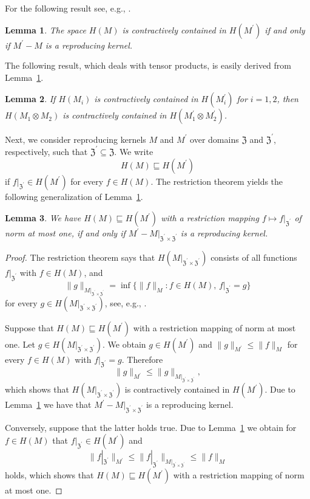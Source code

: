 \documentclass{article}
\newcommand{\Z}{{\mathfrak Z}}
\theoremstyle{plain}
\newtheorem{lemma}{Lemma}
\theoremstyle{definition}
\begin{document}
For the following result see, e.g., \citet[Cor.~5.3]{PR16}.

\begin{lemma}\label{l10}
The space $H(M)$ is contractively contained in $H(M^\prime)$ if and only 
if $M^\prime-M$ is a reproducing kernel.
\end{lemma}

The following result, which deals with tensor products, is easily
derived from Lemma~\ref{l10}.

\begin{lemma}\label{l11}
If $H(M_i)$ is contractively contained in $H(M^\prime_i)$
for $i=1,2$, then $H(M_1 \otimes M_2)$ is contractively contained
in $H(M^\prime_1 \otimes M^\prime_2)$.
\end{lemma}

Next, we consider reproducing kernels $M$ and $M^\prime$ over 
domains $\Z$ and $\Z^\prime$,
respectively, such that $\Z^\prime \subseteq \Z$.
We write 
\[
H(M) \sqsubseteq H(M^\prime)
\] 
if $f|_{\Z^\prime} \in H(M^\prime)$ for 
every $f\in H(M)$. The restriction theorem 
yields the following generalization of  
Lemma~\ref{l10}. 

\begin{lemma}\label{l12}
We have $H(M) \sqsubseteq H(M^\prime)$ with a restriction mapping
$f \mapsto f|_{\Z^\prime}$ of norm at most one, if and only if
$M^\prime-M|_{\Z^\prime \times \Z^\prime}$ is a reproducing kernel.
\end{lemma}

\begin{proof}
The restriction theorem says that $H(M|_{\Z^\prime \times
\Z^\prime})$ consists of all functions $f|_{\Z^\prime}$ with
$f \in H(M)$,
and
\[
\|g\|_{M|_{\Z^\prime \times \Z^\prime}} = \inf\{\|f\|_M : 
\text{$f \in H(M)$, $f|_{\Z^\prime} = g$}\}
\]
for every $g \in H(M|_{\Z^\prime \times \Z^\prime})$, see, e.g.,
\citet[Cor.~5.8]{PR16}. 

Suppose that $H(M) \sqsubseteq H(M^\prime)$ with a restriction mapping
of norm at most one. Let
$g \in H(M|_{\Z^\prime \times \Z^\prime})$. We obtain $g \in
H(M^\prime)$ and $\|g\|_{M^\prime} \leq \|f\|_M$
for every $f \in H(M)$ with $f|_{\Z^\prime} = g$. Therefore
\[
\|g\|_{M^\prime} \leq 
\|g\|_{M|_{\Z^\prime \times \Z^\prime}},
\]
which shows that
$H(M|_{\Z^\prime \times \Z^\prime})$ is
contractively contained in $H(M^\prime)$.
Due to Lemma~\ref{l10} we have that 
$M^\prime-M|_{\Z^\prime \times \Z^\prime}$ is a reproducing kernel.

Conversely, suppose that the latter holds true.
Due to Lemma~\ref{l10}  we obtain for
$f \in H(M)$ that $f|_{\Z^\prime} \in H(M^\prime)$ and
\[
\|f|_{\Z^\prime}\|_{M^\prime} \leq 
\|f|_{\Z^\prime}\|_{M|_{\Z^\prime \times \Z^\prime}} \leq \|f\|_M
\] 
holds, which shows that $H(M) \sqsubseteq H(M^\prime)$ with a 
restriction mapping of norm at most one. 
\end{proof}
\end{document}
